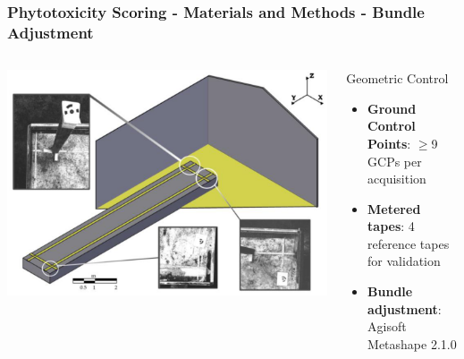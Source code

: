 \documentclass[aspectratio=43]{beamer}
\begin{document}
\begin{frame}
    \frametitle{\small Phytotoxicity Scoring - Materials and Methods - Bundle Adjustment}
    
    \begin{columns}
        \begin{column}{0.7\textwidth}
            \includegraphics[width=\textwidth]{Imgs/agronomy-14-00306-g005.png}
        \end{column}
        
        \begin{column}{0.3\textwidth}
            \begin{block}{Geometric Control}
                \scriptsize
                \begin{itemize}
                    \item \textbf{Ground Control Points}: \ensuremath{\geq}9 GCPs per acquisition
                    \item \textbf{Metered tapes}: 4 reference tapes for validation
                    \item \textbf{Bundle adjustment}: Agisoft Metashape 2.1.0
                \end{itemize}
            \end{block}
        \end{column}
    \end{columns}
\end{frame}
\end{document}
